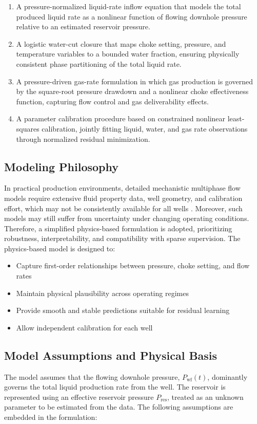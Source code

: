 \documentclass[12pt,APA]{uomthesis}
\begin{document}
\begin{enumerate}
    \item A pressure-normalized liquid-rate inflow equation that models the total produced liquid rate as a nonlinear function of flowing downhole pressure relative to an estimated reservoir pressure.
    \item A logistic water-cut closure that maps choke setting, pressure, and temperature variables to a bounded water fraction, ensuring physically consistent phase partitioning of the total liquid rate.
    \item A pressure-driven gas-rate formulation in which gas production is governed by the square-root pressure drawdown and a nonlinear choke effectiveness function, capturing flow control and gas deliverability effects.
    \item A parameter calibration procedure based on constrained nonlinear least-squares calibration, jointly fitting liquid, water, and gas rate observations through normalized residual minimization.
\end{enumerate}

\subsection{Modeling Philosophy}
In practical production environments, detailed mechanistic multiphase flow models require extensive fluid property data, well geometry, and calibration effort, which may not be consistently available for all wells \citep{beggs1973study, ahmed2010reservoir}. Moreover, such models may still suffer from uncertainty under changing operating conditions. Therefore, a simplified physics-based formulation is adopted, prioritizing robustness, interpretability, and compatibility with sparse supervision.
The physics-based model is designed to:

\begin{itemize}
    \item Capture first-order relationships between pressure, choke setting, and flow rates
    \item Maintain physical plausibility across operating regimes
    \item Provide smooth and stable predictions suitable for residual learning
    \item Allow independent calibration for each well
\end{itemize}

\subsection{Model Assumptions and Physical Basis}
\label{subsec:model_assumptions}
The model assumes that the flowing downhole pressure,
\(
P_{\mathrm{wf}}(t)
\),
dominantly governs the total liquid production rate from the well.
The reservoir is represented using an effective reservoir pressure
\(
P_{\mathrm{res}}
\),
treated as an unknown parameter to be estimated from the data.
The following assumptions are embedded in the formulation:
\end{document}
